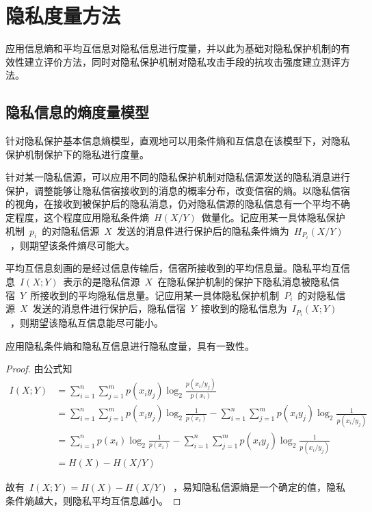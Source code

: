 \section{隐私度量方法}\label{Privacy measures}
应用信息熵和平均互信息对隐私信息进行度量，并以此为基础对隐私保护机制的有效性建立评价方法，同时对隐私保护机制对隐私攻击手段的抗攻击强度建立测评方法。

\subsection{隐私信息的熵度量模型}

针对隐私保护基本信息熵模型，直观地可以用条件熵和互信息在该模型下，对隐私保护机制保护下的隐私进行度量。

针对某一隐私信源，可以应用不同的隐私保护机制对隐私信源发送的隐私消息进行保护，调整能够让隐私信宿接收到的消息的概率分布，改变信宿的熵。以隐私信宿的视角，在接收到被保护后的隐私消息，仍对隐私信源的隐私信息有一个平均不确定程度，这个程度应用隐私条件熵~$H(X/Y)$~做量化。记应用某一具体隐私保护机制~$p_{i}$~的对隐私信源~$X$~发送的消息件进行保护后的隐私条件熵为~$H_{P_{i}}(X/Y)$~，则期望该条件熵尽可能大。

平均互信息刻画的是经过信息传输后，信宿所接收到的平均信息量。隐私平均互信息~$I(X;Y)$~表示的是隐私信源~$X$~在隐私保护机制的保护下隐私消息被隐私信宿~$Y$~所接收到的平均隐私信息量。记应用某一具体隐私保护机制~$P_{i}$~的对隐私信源~$X$~发送的消息件进行保护后，隐私信宿~$Y$~接收到的隐私信息为~$I_{P_{i}}(X;Y)$~，则期望该隐私互信息能尽可能小。

\begin{property}
应用隐私条件熵和隐私互信息进行隐私度量，具有一致性。
\end{property}
\begin{proof}
	由公式知
	\begin{equation}
	\begin{split}
	I(X;Y)&=\sum_{i=1}^{n}\sum_{j=1}^{m}p(x_{i}y_{j})\log_{2}\frac{p(x_{i}/y_{j})}{p(x_{i})}\\
	&=\sum_{i=1}^{n}\sum_{j=1}^{m}p(x_{i}y_{j})\log_{2}\frac{1}{p(x_{i})}-\sum_{i=1}^{n}\sum_{j=1}^{m}p(x_{i}y_{j})\log_{2}\frac{1}{p(x_{i}/y_{j})}\\
	&=\sum_{i=1}^{n}p(x_{i})\log_{2}\frac{1}{p(x_{i})}-\sum_{i=1}^{n}\sum_{j=1}^{m}p(x_{i}y_{j})\log_{2}\frac{1}{p(x_{i}/y_{j})}\\
	&=H(X)-H(X/Y)
	\end{split}
	\end{equation}
	
	故有~$I(X;Y)=H(X)-H(X/Y)$~，易知隐私信源熵是一个确定的值，隐私条件熵越大，则隐私平均互信息越小。
\end{proof}


